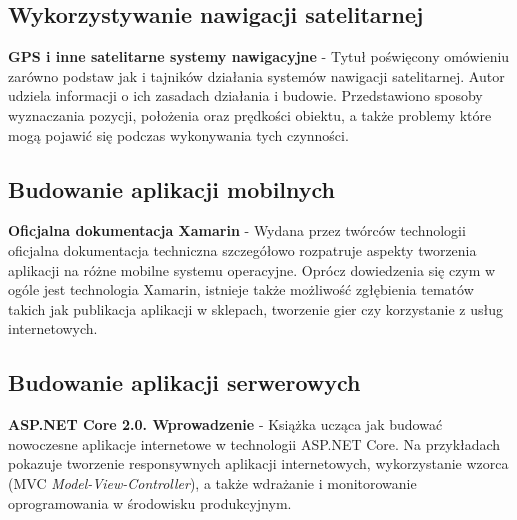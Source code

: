 \subsection{Wykorzystywanie nawigacji satelitarnej}
\textbf{GPS i inne satelitarne systemy nawigacyjne} \cite{gps2} - Tytuł poświęcony omówieniu zarówno podstaw jak i tajników działania systemów nawigacji satelitarnej. Autor udziela informacji o ich zasadach działania i budowie. Przedstawiono sposoby wyznaczania pozycji, położenia oraz prędkości obiektu, a także problemy które mogą pojawić się podczas wykonywania tych czynności.
\subsection{Budowanie aplikacji mobilnych}
\textbf{Oficjalna dokumentacja Xamarin} \cite{xamarin_docs_real} - Wydana przez twórców technologii oficjalna dokumentacja techniczna szczegółowo rozpatruje aspekty tworzenia aplikacji na różne mobilne systemu operacyjne. Oprócz dowiedzenia się czym w ogóle jest technologia Xamarin, istnieje także możliwość zgłębienia tematów takich jak publikacja aplikacji w sklepach, tworzenie gier czy korzystanie z usług internetowych.
\subsection{Budowanie aplikacji serwerowych}
\textbf{ASP.NET Core 2.0. Wprowadzenie} \cite{ksiazka-asp-core} - Książka ucząca jak budować nowoczesne aplikacje internetowe w technologii ASP.NET Core. Na przykładach pokazuje tworzenie responsywnych aplikacji internetowych, wykorzystanie wzorca (MVC \textit{Model-View-Controller}), a także wdrażanie i monitorowanie oprogramowania w środowisku produkcyjnym.
